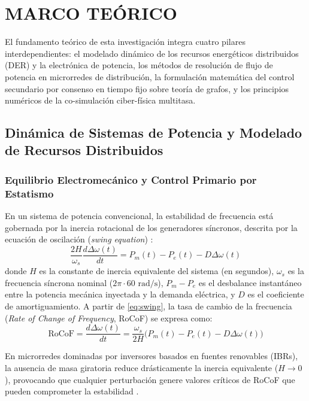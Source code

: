\section{MARCO TEÓRICO}
\label{sec:teoria}

El fundamento teórico de esta investigación integra cuatro pilares interdependientes: el modelado dinámico de los recursos energéticos distribuidos (DER) y la electrónica de potencia, los métodos de resolución de flujo de potencia en microrredes de distribución, la formulación matemática del control secundario por consenso en tiempo fijo sobre teoría de grafos, y los principios numéricos de la co-simulación ciber-física multitasa.

\subsection{Dinámica de Sistemas de Potencia y Modelado de Recursos Distribuidos}

\subsubsection{Equilibrio Electromecánico y Control Primario por Estatismo}
En un sistema de potencia convencional, la estabilidad de frecuencia está gobernada por la inercia rotacional de los generadores síncronos, descrita por la ecuación de oscilación (\textit{swing equation}) \citep{Saadat2010}:
\begin{equation}\label{eq:swing}
\frac{2H}{\omega_s} \frac{d\Delta\omega(t)}{dt} = P_m(t) - P_e(t) - D \Delta\omega(t)
\end{equation}
donde $H$ es la constante de inercia equivalente del sistema (en segundos), $\omega_s$ es la frecuencia síncrona nominal ($2\pi \cdot 60\text{ rad/s}$), $P_m - P_e$ es el desbalance instantáneo entre la potencia mecánica inyectada y la demanda eléctrica, y $D$ es el coeficiente de amortiguamiento. A partir de \eqref{eq:swing}, la tasa de cambio de la frecuencia (\textit{Rate of Change of Frequency}, RoCoF) se expresa como:
\begin{equation}\label{eq:rocof}
\text{RoCoF} = \frac{d\Delta\omega(t)}{dt} = \frac{\omega_s}{2H} \big(P_m(t) - P_e(t) - D \Delta\omega(t) \big)
\end{equation}

En microrredes dominadas por inversores basados en fuentes renovables (IBRs), la ausencia de masa giratoria reduce drásticamente la inercia equivalente ($H \to 0$), provocando que cualquier perturbación genere valores críticos de RoCoF que pueden comprometer la estabilidad \citep{Mehrzad2025}.


